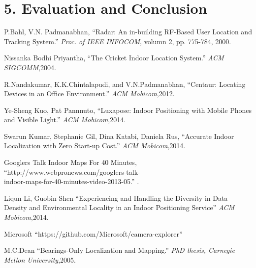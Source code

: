 \documentclass[a4paper, 11pt]{article} %
\begin{document}
\section*{5. Evaluation and Conclusion}


\begin{thebibliography}{10}
	
P.Bahl, V.N. Padmanabhan,
``Radar: An in-building RF-Based User Location and Tracking System.''
\textit{Proc. of IEEE INFOCOM}, volumn 2, pp. 775-784, 2000.

Nissanka Bodhi Priyantha,
``The Cricket Indoor Location System.''
\textit{ACM SIGCOMM},2004.

R.Nandakumar, K.K.Chintalapudi, and V.N.Padmanabhan,
``Centaur: Locating Devices in an Office Environment.''
\textit{ACM Mobicom},2012.

Ye-Sheng Kuo, Pat Pannnuto,
``Luxapose: Indoor Positioning with Mobile Phones and Visible Light.''
\textit{ACM Mobicom},2014.

Swarun Kumar, Stephanie Gil, Dina Katabi, Daniela Rus,
``Accurate Indoor Localization with Zero Start-up Cost.''
\textit{ACM Mobicom},2014.


Googlers Talk Indoor Maps For 40 Minutes,
``http://www.webpronews.com/googlers-talk-\\indoor-maps-for-40-minutes-video-2013-05.''
\textit{}.

Liqun Li, Guobin Shen
``Experiencing and Handling the Diversity in Data Density and Environmental Locality in an Indoor Positioning Service''
\textit{ACM Mobicom},2014.

Microsoft
``https://github.com/Microsoft/camera-explorer''
\textit{}

M.C.Dean
``Bearings-Only Localization and Mapping.''
\textit{PhD thesis, Carnegie Mellon University},2005.


\end{thebibliography}

\end{document}
